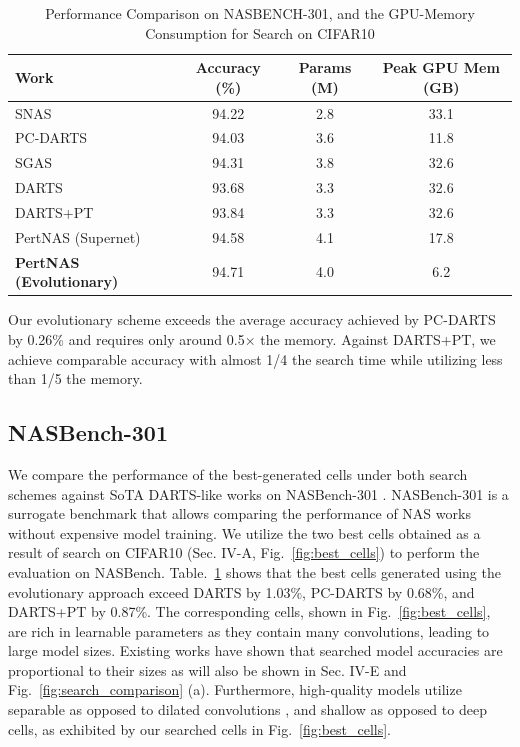 \documentclass[onecolumn]{IEEEtran}
\begin{document}
	
	\begin{table}[ht]
		\centering
		\caption{Performance Comparison on NASBENCH-301, and the GPU-Memory Consumption for Search on CIFAR10}
		\label{comparison_2}
			\begin{tabular}{lccc}
				\hline
				Work & Accuracy (\%) & Params (M) & Peak GPU Mem (GB) \\ \hline
				SNAS \cite{Xie2018} & 94.22 & 2.8 & 33.1 \\
				PC-DARTS \cite{Xu2019} & 94.03 & 3.6 & 11.8 \\
				SGAS \cite{Li2020SGAS} & 94.31 & 3.8 & 32.6 \\
				DARTS \cite{Liu2018} & 93.68 & 3.3 & 32.6 \\
				DARTS+PT \cite{Wang2021} & 93.84 & 3.3 & 32.6 \\
				PertNAS (Supernet) & 94.58 & 4.1 & 17.8 \\ \hline
				\textbf{PertNAS (Evolutionary)} & 94.71 & 4.0 & 6.2 \\ \hline
			\end{tabular}
		

	\end{table}


Our evolutionary scheme exceeds the average accuracy achieved by PC-DARTS \cite{Xu2019} by 0.26\% and requires only around 0.5× the memory. Against DARTS+PT, we achieve comparable accuracy with almost 1/4 the search time while utilizing less than 1/5 the memory.

\subsection{NASBench-301}
We compare the performance of the best-generated cells under both search schemes against SoTA DARTS-like works on NASBench-301 \cite{Siems2020}. NASBench-301 is a surrogate benchmark that allows comparing the performance of NAS works without expensive model training. We utilize the two best cells obtained as a result of search on CIFAR10 (Sec. IV-A, Fig.~\ref{fig:best_cells}) to perform the evaluation on NASBench. Table.~\ref{comparison_2} shows that the best cells generated using the evolutionary approach exceed DARTS \cite{Liu2018} by 1.03\%, PC-DARTS \cite{Xu2019} by 0.68\%, and DARTS+PT \cite{Wang2021} by 0.87\%. The corresponding cells, shown in Fig.~\ref{fig:best_cells}, are rich in learnable parameters as they contain many convolutions, leading to large model sizes. Existing works have shown that searched model accuracies are proportional to their sizes \cite{Zela2020, Siems2020} as will also be shown in Sec. IV-E and Fig.~\ref{fig:search_comparison} (a). Furthermore, high-quality models utilize separable as opposed to dilated convolutions \cite{Siems2020}, and shallow as opposed to deep cells, as exhibited by our searched cells in Fig.~\ref{fig:best_cells}.
\end{document}
